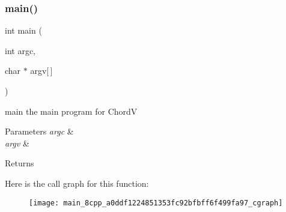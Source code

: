 \subsubsection{main()}
{\footnotesize\ttfamily int main (\begin{DoxyParamCaption}\item[{int}]{argc,  }\item[{char $\ast$}]{argv[$\,$] }\end{DoxyParamCaption})}



main the main program for ChordV 


\begin{DoxyParams}{Parameters}
{\em argc} & \\
\hline
{\em argv} & \\
\hline
\end{DoxyParams}
\begin{DoxyReturn}{Returns}

\end{DoxyReturn}
Here is the call graph for this function\+:\nopagebreak
\begin{figure}[H]
\begin{center}
\leavevmode
\texttt{[image: main\_8cpp\_a0ddf1224851353fc92bfbff6f499fa97\_cgraph]}
\end{center}
\end{figure}
